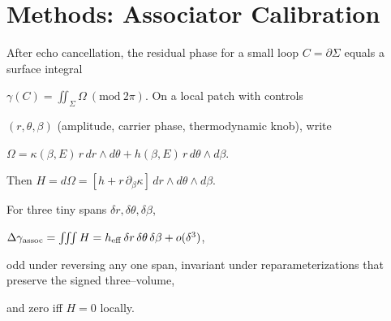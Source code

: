 \section*{Methods: Associator Calibration}

After echo cancellation, the residual phase for a small loop \(C=\partial\Sigma\) equals a surface integral

\(\gamma(C)=\iint_{\Sigma}\Omega \ (\mathrm{mod}\ 2\pi)\). On a local patch with controls

\((r,\theta,\beta)\) (amplitude, carrier phase, thermodynamic knob), write

\(\Omega=\kappa(\beta,E)\,r\,dr\wedge d\theta + h(\beta,E)\,r\,d\theta\wedge d\beta\).

Then \(H=d\Omega=[h+r\,\partial_\beta\kappa]\,dr\wedge d\theta\wedge d\beta\).

For three tiny spans \(\delta r,\delta\theta,\delta\beta\),

\(\Delta\gamma_{\rm assoc}=\iiint H = h_{\rm eff}\,\delta r\,\delta\theta\,\delta\beta + o(\delta^3)\),

odd under reversing any one span, invariant under reparameterizations that preserve the signed three–volume,

and zero iff \(H=0\) locally.
